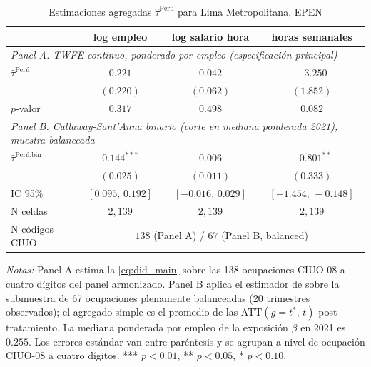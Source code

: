 \begin{table}[H]
\centering
\small
\begin{threeparttable}
\caption{Estimaciones agregadas $\hat\tau^{\text{Per\'{u}}}$ para Lima Metropolitana, EPEN}
\label{tab:peru_main}
\begin{tabular}{l c c c}
\toprule
                                                & log empleo            & log salario hora       & horas semanales        \\
\midrule
\multicolumn{4}{l}{\emph{Panel A. TWFE continuo, ponderado por empleo (especificaci\'{o}n principal)}} \\
$\hat\tau^{\text{Per\'{u}}}$                    & $0.221$               & $0.042$                & $-3.250$               \\
                                                & $(0.220)$             & $(0.062)$              & $(1.852)$              \\
$p$-valor                                       & $0.317$               & $0.498$                & $0.082$                \\
\midrule
\multicolumn{4}{l}{\emph{Panel B. Callaway-Sant'Anna binario (corte en mediana ponderada 2021), muestra balanceada}} \\
$\hat\tau^{\text{Per\'{u},bin}}$              & $\mathbf{0.144^{***}}$ & $0.006$                & $\mathbf{-0.801^{**}}$ \\
                                                & $(0.025)$             & $(0.011)$              & $(0.333)$              \\
IC 95\%                                         & $[0.095,\, 0.192]$    & $[-0.016,\, 0.029]$    & $[-1.454,\, -0.148]$   \\
\midrule
N celdas                                        & $2{,}139$             & $2{,}139$              & $2{,}139$              \\
N c\'{o}digos CIUO                              & \multicolumn{3}{c}{$138$ (Panel A) \quad / \quad $67$ (Panel B, balanced)}                       \\
\bottomrule
\end{tabular}
\begin{tablenotes}[flushleft]
\footnotesize
\item \emph{Notas:} Panel A estima la \cref{eq:did_main} sobre las 138 ocupaciones CIUO-08 a cuatro d\'{i}gitos del panel armonizado. Panel B aplica el estimador de \citet{CallawayS2021_did} sobre la submuestra de 67 ocupaciones plenamente balanceadas (20 trimestres observados); el agregado simple es el promedio de las ATT$(g{=}t^\ast,\,t)$ post-tratamiento. La mediana ponderada por empleo de la exposici\'{o}n $\beta$ en 2021 es $0.255$. Los errores est\'{a}ndar van entre par\'{e}ntesis y se agrupan a nivel de ocupaci\'{o}n CIUO-08 a cuatro d\'{i}gitos. *** $p<0.01$, ** $p<0.05$, * $p<0.10$.
\end{tablenotes}
\end{threeparttable}
\end{table}

